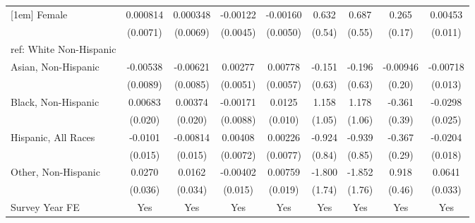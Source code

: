 \begin{table}[htbp]
\begin{tabular}{l*{8}{c}}
[1em]
Female&    0.000814         &    0.000348         &    -0.00122         &    -0.00160         &       0.632         &       0.687         &       0.265         &     0.00453         \\
  &    (0.0071)         &    (0.0069)         &    (0.0045)         &    (0.0050)         &      (0.54)         &      (0.55)         &      (0.17)         &     (0.011)         \\
[1em]
ref: White Non-Hispanic&                     &                     &                     &                     &                     &                     &                     &                     \\
[1em]
Asian, Non-Hispanic&    -0.00538         &    -0.00621         &     0.00277         &     0.00778         &      -0.151         &      -0.196         &    -0.00946         &    -0.00718         \\
  &    (0.0089)         &    (0.0085)         &    (0.0051)         &    (0.0057)         &      (0.63)         &      (0.63)         &      (0.20)         &     (0.013)         \\
[1em]
Black, Non-Hispanic&     0.00683         &     0.00374         &    -0.00171         &      0.0125         &       1.158         &       1.178         &      -0.361         &     -0.0298         \\
  &     (0.020)         &     (0.020)         &    (0.0088)         &     (0.010)         &      (1.05)         &      (1.06)         &      (0.39)         &     (0.025)         \\
[1em]
Hispanic, All Races&     -0.0101         &    -0.00814         &     0.00408         &     0.00226         &      -0.924         &      -0.939         &      -0.367         &     -0.0204         \\
  &     (0.015)         &     (0.015)         &    (0.0072)         &    (0.0077)         &      (0.84)         &      (0.85)         &      (0.29)         &     (0.018)         \\
[1em]
Other, Non-Hispanic&      0.0270         &      0.0162         &    -0.00402         &     0.00759         &      -1.800         &      -1.852         &       0.918\sym{**} &      0.0641\sym{**} \\
  &     (0.036)         &     (0.034)         &     (0.015)         &     (0.019)         &      (1.74)         &      (1.76)         &      (0.46)         &     (0.033)         \\
[1em]
Survey Year FE&         Yes         &         Yes         &         Yes         &         Yes         &         Yes         &         Yes         &         Yes         &         Yes         \\

\end{tabular}
\end{table}
